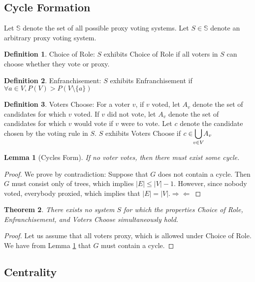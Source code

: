 \documentclass[10pt]{article}
\newtheorem{theorem}{Theorem}[section]
\newtheorem{lemma}[theorem]{Lemma}
\theoremstyle{definition}
\newtheorem{definition}{Definition}[section]
\newcommand{\bb}[1]{\mathbb{#1}}
\begin{document}
\subsection{Cycle Formation}
Let $\bb{S}$ denote the set of all possible proxy voting systems. Let $S \in \bb{S}$ denote an arbitrary proxy voting system.


\theoremstyle{definition}
\begin{definition}{Choice of Role:}
$S$ exhibits Choice of Role if all voters in $S$ can choose whether they vote or proxy.
\end{definition}

\theoremstyle{definition}
\begin{definition}{Enfranchisement:}
$S$ exhibits Enfranchisement if $\forall a \in V, P(V) > P(V\setminus\{a\})$
\end{definition}

\theoremstyle{definition}
\begin{definition}{Voters Choose:}
For a voter $v$, if $v$ voted, let $A_v$ denote the set of candidates for which $v$ voted. If $v$ did not vote, let $A_v$ denote the set of candidates for which $v$ would vote if $v$ were to vote. Let $c$ denote the candidate chosen by the voting rule in $S$. $S$ exhibits Voters Choose if $c \in \smashoperator{\bigcup\limits_{v \in V}}A_v$ 
\end{definition}

\begin{lemma}[Cycles Form]
\label{cyclesform}
If no voter votes, then there must exist some cycle.
\end{lemma}
\begin{proof}
We prove by contradiction:
Suppose that $G$ does not contain a cycle. Then $G$ must consist only of trees, which implies $|E| \leq |V| -1$. However, since nobody voted, everybody proxied, which implies that $|E| = |V|. \Rightarrow\Leftarrow$
\end{proof}

\begin{theorem} 
\label{CFLIT}
There exists no system $S$ for which the properties Choice of Role, Enfranchisement, and Voters Choose simultaneously hold.
\end{theorem}
\begin{proof}
Let us assume that all voters proxy, which is allowed under Choice of Role. We have from Lemma \ref{cyclesform} that $G$ must contain a cycle. 
\end{proof}

\subsection{Centrality}
\end{document}
